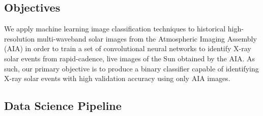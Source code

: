 \documentclass[12pt, letterpaper]{article}
\begin{document}
\subsection*{Objectives}

We apply machine learning image classification techniques to historical high-resolution multi-waveband solar images from the Atmospheric Imaging Assembly (AIA) in order to train a set of convolutional neural networks to identify X-ray solar events from rapid-cadence, live images of the Sun obtained by the AIA. As such, our primary objective is to produce a binary classifier capable of identifying X-ray solar events with high validation accuracy using only AIA images. 



\subsection*{Data Science Pipeline}

		
\end{document}
